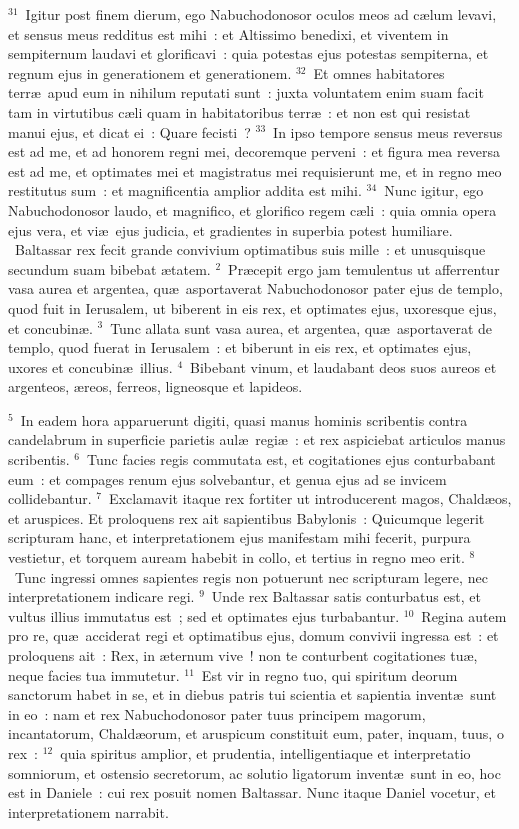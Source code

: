 ${}^{31}$~Igitur post finem dierum, ego Nabuchodonosor oculos meos ad c\ae lum levavi, et sensus meus redditus est mihi~: et Altissimo benedixi, et viventem in sempiternum laudavi et glorificavi~: quia potestas ejus potestas sempiterna, et regnum ejus in generationem et generationem.
${}^{32}$~Et omnes habitatores terr\ae\ apud eum in nihilum reputati sunt~: juxta voluntatem enim suam facit tam in virtutibus c\ae li quam in habitatoribus terr\ae~: et non est qui resistat manui ejus, et dicat ei~: Quare fecisti~?
${}^{33}$~In ipso tempore sensus meus reversus est ad me, et ad honorem regni mei, decoremque perveni~: et figura mea reversa est ad me, et optimates mei et magistratus mei requisierunt me, et in regno meo restitutus sum~: et magnificentia amplior addita est mihi.
${}^{34}$~Nunc igitur, ego Nabuchodonosor laudo, et magnifico, et glorifico regem c\ae li~: quia omnia opera ejus vera, et vi\ae\ ejus judicia, et gradientes in superbia potest humiliare.
~Baltassar rex fecit grande convivium optimatibus suis mille~: et unusquisque secundum suam bibebat \ae tatem.
${}^{2}$~Pr\ae cepit ergo jam temulentus ut afferrentur vasa aurea et argentea, qu\ae\ asportaverat Nabuchodonosor pater ejus de templo, quod fuit in Ierusalem, ut biberent in eis rex, et optimates ejus, uxoresque ejus, et concubin\ae .
${}^{3}$~Tunc allata sunt vasa aurea, et argentea, qu\ae\ asportaverat de templo, quod fuerat in Ierusalem~: et biberunt in eis rex, et optimates ejus, uxores et concubin\ae\ illius.
${}^{4}$~Bibebant vinum, et laudabant deos suos aureos et argenteos, \ae reos, ferreos, ligneosque et lapideos.


${}^{5}$~In eadem hora apparuerunt digiti, quasi manus hominis scribentis contra candelabrum in superficie parietis aul\ae\ regi\ae~: et rex aspiciebat articulos manus scribentis.
${}^{6}$~Tunc facies regis commutata est, et cogitationes ejus conturbabant eum~: et compages renum ejus solvebantur, et genua ejus ad se invicem collidebantur.
${}^{7}$~Exclamavit itaque rex fortiter ut introducerent magos, Chald\ae os, et aruspices. Et proloquens rex ait sapientibus Babylonis~: Quicumque legerit scripturam hanc, et interpretationem ejus manifestam mihi fecerit, purpura vestietur, et torquem auream habebit in collo, et tertius in regno meo erit.
${}^{8}$~Tunc ingressi omnes sapientes regis non potuerunt nec scripturam legere, nec interpretationem indicare regi.
${}^{9}$~Unde rex Baltassar satis conturbatus est, et vultus illius immutatus est~; sed et optimates ejus turbabantur.
${}^{10}$~Regina autem pro re, qu\ae\ acciderat regi et optimatibus ejus, domum convivii ingressa est~: et proloquens ait~: Rex, in \ae ternum vive~! non te conturbent cogitationes tu\ae , neque facies tua immutetur.
${}^{11}$~Est vir in regno tuo, qui spiritum deorum sanctorum habet in se, et in diebus patris tui scientia et sapientia invent\ae\ sunt in eo~: nam et rex Nabuchodonosor pater tuus principem magorum, incantatorum, Chald\ae orum, et aruspicum constituit eum, pater, inquam, tuus, o rex~:
${}^{12}$~quia spiritus amplior, et prudentia, intelligentiaque et interpretatio somniorum, et ostensio secretorum, ac solutio ligatorum invent\ae\ sunt in eo, hoc est in Daniele~: cui rex posuit nomen Baltassar. Nunc itaque Daniel vocetur, et interpretationem narrabit.


